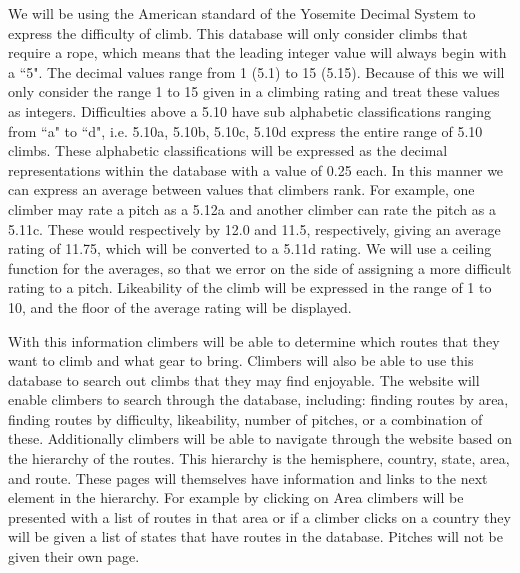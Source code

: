 \documentclass[12pt,letter]{article}
\begin{document}
We will be using the American standard of the Yosemite Decimal System to express
the difficulty of climb. This
database will only consider climbs that require a rope, which means that the
leading integer value will always begin with a ``5". The decimal values range
from 1 (5.1) to 15 (5.15). Because of this we will only consider the range 1 to
15 given in a climbing rating and treat these values as integers.  Difficulties
above a 5.10 have sub alphabetic classifications ranging from ``a" to ``d", i.e.
5.10a, 5.10b, 5.10c, 5.10d express the entire range of 5.10 climbs.  These
alphabetic classifications will be expressed as the decimal representations
within the database with a value of 0.25 each. In this manner we can express an
average between values that climbers rank. For example, one climber may rate a
pitch as a 5.12a and another climber can rate the pitch as a 5.11c. These would
respectively by 12.0 and 11.5, respectively, giving an average rating of 11.75,
which will be converted to a 5.11d rating. We will use a ceiling function for
the averages, so that we error on the side of assigning a more difficult rating
to a pitch. Likeability of the climb will be expressed in the range of 1 to 10,
and the floor of the average rating will be displayed.

With this information climbers will be able to determine which routes that they
want to climb and what gear to bring. Climbers will also be able to use this
database to search out climbs that they may find enjoyable. The website will
enable climbers to search through the database, including: finding routes by
area, finding routes by difficulty, likeability, number of pitches, or a
combination of these. Additionally climbers will be able to navigate through the
website based on the hierarchy of the routes. This hierarchy is the hemisphere,
country, state, area, and route. These pages will themselves have information
and links to the next element in the hierarchy. For example by clicking on Area
climbers will be presented with a list of routes in that area or if a climber
clicks on a country they will be given a list of states that have routes in the
database. Pitches will not be given their own page. 
\end{document}
